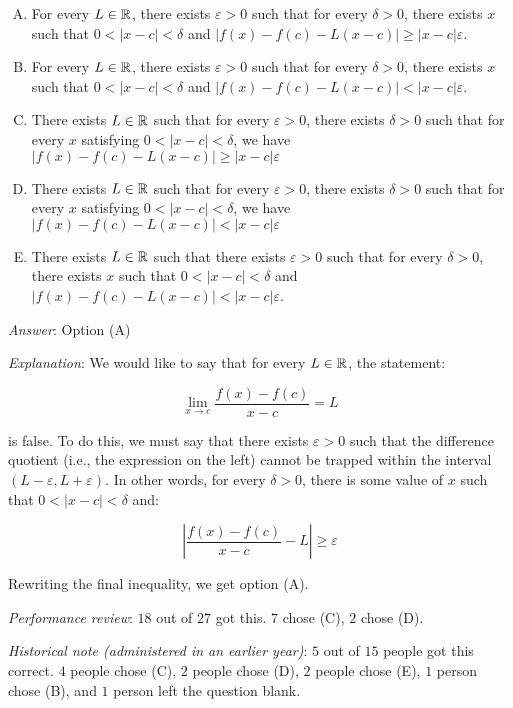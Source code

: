 \documentclass[10pt]{amsart}
\begin{document}
\begin{enumerate}
  \begin{enumerate}[(A)]
  \item For every $L \in \mathbb{R}$, there exists $\varepsilon > 0$ such that
    for every $\delta > 0$, there exists $x$ such that $0 < |x - c| <
    \delta$ and $|f(x) - f(c) - L(x - c)| \ge |x - c|\varepsilon$.
  \item For every $L \in \mathbb{R}$, there exists $\varepsilon > 0$ such that
    for every $\delta > 0$, there exists $x$ such that $0 < |x - c| <
    \delta$ and $|f(x) - f(c) - L(x - c)| < |x - c|\varepsilon$.
  \item There exists $L \in \mathbb{R}$ such that for every $\varepsilon > 0$,
  there exists $\delta > 0$ such that for every $x$ satisfying $0 < |x
  - c| < \delta$, we have $|f(x) - f(c) - L(x - c)| \ge |x - c|\varepsilon$
  \item There exists $L \in \mathbb{R}$ such that for every $\varepsilon > 0$,
  there exists $\delta > 0$ such that for every $x$ satisfying $0 < |x
  - c| < \delta$, we have $|f(x) - f(c) - L(x - c)| < |x - c|\varepsilon$
  \item There exists $L \in \mathbb{R}$ such that there exists $\varepsilon > 0$
    such that for every $\delta > 0$, there exists $x$ such that $0 <
    |x - c| < \delta$ and $|f(x) - f(c) - L(x - c)| < |x - c|\varepsilon$.
  \end{enumerate}

  {\em Answer}: Option (A)

  {\em Explanation}: We would like to say that for every $L \in \mathbb{R}$,
  the statement:

  $$\lim_{x \to c} \frac{f(x) - f(c)}{x - c} = L$$

  is false. To do this, we must say that there exists $\varepsilon > 0$
  such that the difference quotient (i.e., the expression on the left)
  cannot be trapped within the interval $(L - \varepsilon,L +
  \varepsilon)$. In other words, for every $\delta > 0$, there is some
  value of $x$ such that $0 < |x -c| < \delta$ and:

  $$\left|\frac{f(x) - f(c)}{x - c} - L\right| \ge \varepsilon$$

  Rewriting the final inequality, we get option (A).

  {\em Performance review}: $18$ out of $27$ got this. $7$ chose (C),
  $2$ chose (D).

  {\em Historical note (administered in an earlier year)}: $5$ out of
  $15$ people got this correct. $4$ people chose (C), $2$ people chose
  (D), $2$ people chose (E), $1$ person chose (B), and $1$ person left
  the question blank.


\end{enumerate}
\end{document}
